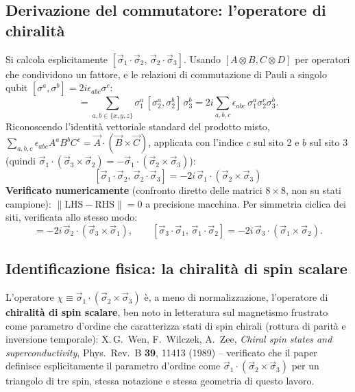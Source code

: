 \documentclass[11pt,a4paper]{article}
\begin{document}
\subsection{Derivazione del commutatore: l'operatore di chiralità}

Si calcola esplicitamente $[\vec\sigma_1\!\cdot\!\vec\sigma_2,\,\vec\sigma_2\!\cdot\!\vec\sigma_3]$. Usando $[A\otimes B, C\otimes D]$ per operatori che condividono un fattore, e le relazioni di commutazione di Pauli a singolo qubit $[\sigma^a,\sigma^b]=2i\epsilon_{abc}\sigma^c$:
\begin{equation}
[\vec\sigma_1\!\cdot\!\vec\sigma_2,\,\vec\sigma_2\!\cdot\!\vec\sigma_3] = \sum_{a,b\in\{x,y,z\}}\sigma_1^a\,[\sigma_2^a,\sigma_2^b]\,\sigma_3^b = 2i\sum_{a,b,c}\epsilon_{abc}\,\sigma_1^a\sigma_2^c\sigma_3^b.
\end{equation}
Riconoscendo l'identità vettoriale standard del prodotto misto, $\sum_{a,b,c}\epsilon_{abc}A^aB^bC^c = \vec A\cdot(\vec B\times\vec C)$, applicata con l'indice $c$ sul sito 2 e $b$ sul sito 3 (quindi $\vec\sigma_1\cdot(\vec\sigma_3\times\vec\sigma_2)=-\vec\sigma_1\cdot(\vec\sigma_2\times\vec\sigma_3)$):
\begin{equation}
\boxed{[\vec\sigma_1\!\cdot\!\vec\sigma_2,\,\vec\sigma_2\!\cdot\!\vec\sigma_3] = -2i\,\vec\sigma_1\cdot(\vec\sigma_2\times\vec\sigma_3)}
\label{eq:chirality-comm}
\end{equation}
\textbf{Verificato numericamente} (confronto diretto delle matrici $8\times8$, non su stati campione): $\|\text{LHS}-\text{RHS}\|=0$ a precisione macchina. Per simmetria ciclica dei siti, verificata allo stesso modo:
\begin{equation}
[\vec\sigma_2\!\cdot\!\vec\sigma_3,\,\vec\sigma_3\!\cdot\!\vec\sigma_1] = -2i\,\vec\sigma_2\cdot(\vec\sigma_3\times\vec\sigma_1), \qquad [\vec\sigma_3\!\cdot\!\vec\sigma_1,\,\vec\sigma_1\!\cdot\!\vec\sigma_2] = -2i\,\vec\sigma_3\cdot(\vec\sigma_1\times\vec\sigma_2).
\label{eq:chirality-comm-cyclic}
\end{equation}

\subsection{Identificazione fisica: la chiralità di spin scalare}

L'operatore $\chi \equiv \vec\sigma_1\cdot(\vec\sigma_2\times\vec\sigma_3)$ è, a meno di normalizzazione, l'operatore di \textbf{chiralità di spin scalare}, ben noto in letteratura sul magnetismo frustrato come parametro d'ordine che caratterizza stati di spin chirali (rottura di parità e inversione temporale): X.\,G.\ Wen, F.\ Wilczek, A.\ Zee, \emph{Chiral spin states and superconductivity}, Phys.\ Rev.\ B \textbf{39}, 11413 (1989) -- verificato che il paper definisce esplicitamente il parametro d'ordine come $\vec\sigma_1\cdot(\vec\sigma_2\times\vec\sigma_3)$ per un triangolo di tre spin, stessa notazione e stessa geometria di questo lavoro.
\end{document}
